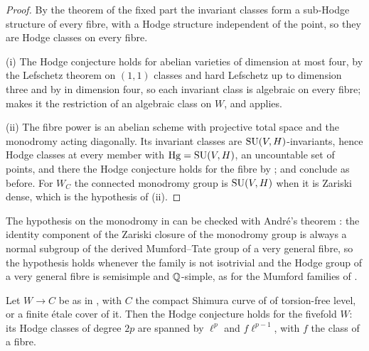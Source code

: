 \begin{proof}
By the theorem of the fixed part the invariant classes form a sub-Hodge
structure of every fibre, with a Hodge structure independent of the point, so
they are Hodge classes on every fibre.

(i) The Hodge conjecture holds for abelian varieties of dimension at most
four, by the Lefschetz theorem on $(1,1)$ classes and hard Lefschetz up to
dimension three and by \cite{Mar25a} in dimension four, so each invariant
class is algebraic on every fibre;  makes it the
restriction of an algebraic class on $W$, and 
applies.

(ii) The fibre power is an abelian scheme with projective total space and
the monodromy acting diagonally. Its invariant classes are
$\operatorname{SU}(V,H)$-invariants, hence Hodge classes at every member with
$\operatorname{Hg}=\operatorname{SU}(V,H)$, an uncountable set of points, and there the Hodge conjecture
holds for the fibre by ;  and
 conclude as before. For $W_{C}$ the connected
monodromy group is $\operatorname{SU}(V,H)$ when it is Zariski dense, which is the
hypothesis of (ii).
\end{proof}

The hypothesis on the monodromy in  can be checked
with Andr\'e's theorem \cite[Theorem~1]{And92}: the identity component of the
Zariski closure of the monodromy group is always a normal subgroup of the
derived Mumford--Tate group of a very general fibre, so the hypothesis holds
whenever the family is not isotrivial and the Hodge group of a very general
fibre is semisimple and $\mathbb{Q}$-simple, as for the Mumford families of
.

\begin{proposition}
\label{prop:mumfordfivefold}
Let $W\to C$ be as in , with $C$ the compact
Shimura curve of \cite{Mum69} of torsion-free level, or a finite \'etale cover
of it. Then the Hodge conjecture holds for the fivefold $W$: its Hodge classes
of degree $2p$ are spanned by $\ell^{p}$ and $f\ell^{p-1}$, with $f$ the class
of a fibre.
\end{proposition}

